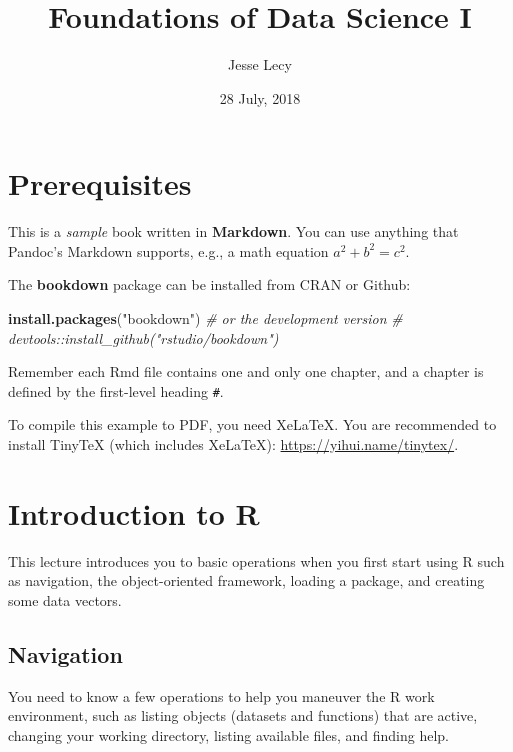 \documentclass[]{book}
\title{Foundations of Data Science I}
\author{Jesse Lecy}
\date{28 July, 2018}
\newenvironment{Shaded}{\begin{snugshade}}{\end{snugshade}}
\newcommand{\CommentTok}[1]{\textcolor[rgb]{0.56,0.35,0.01}{\textit{#1}}}
\newcommand{\KeywordTok}[1]{\textcolor[rgb]{0.13,0.29,0.53}{\textbf{#1}}}
\newcommand{\NormalTok}[1]{#1}
\newcommand{\StringTok}[1]{\textcolor[rgb]{0.31,0.60,0.02}{#1}}
\theoremstyle{definition}
\theoremstyle{definition}
\theoremstyle{definition}
\theoremstyle{remark}
\begin{document}
\maketitle

{
\setcounter{tocdepth}{1}
\tableofcontents
}
\hypertarget{prerequisites}{%
\chapter{Prerequisites}\label{prerequisites}}

This is a \emph{sample} book written in \textbf{Markdown}. You can use
anything that Pandoc's Markdown supports, e.g., a math equation
\(a^2 + b^2 = c^2\).

The \textbf{bookdown} package can be installed from CRAN or Github:

\begin{Shaded}
\begin{Highlighting}[]
\KeywordTok{install.packages}\NormalTok{(}\StringTok{"bookdown"}\NormalTok{)}
\CommentTok{# or the development version}
\CommentTok{# devtools::install_github("rstudio/bookdown")}
\end{Highlighting}
\end{Shaded}

Remember each Rmd file contains one and only one chapter, and a chapter
is defined by the first-level heading \texttt{\#}.

To compile this example to PDF, you need XeLaTeX. You are recommended to
install TinyTeX (which includes XeLaTeX):
\url{https://yihui.name/tinytex/}.

\hypertarget{introduction-to-r}{%
\chapter{Introduction to R}\label{introduction-to-r}}

This lecture introduces you to basic operations when you first start
using R such as navigation, the object-oriented framework, loading a
package, and creating some data vectors.

\hypertarget{navigation}{%
\section{Navigation}\label{navigation}}

You need to know a few operations to help you maneuver the R work
environment, such as listing objects (datasets and functions) that are
active, changing your working directory, listing available files, and
finding help.
\end{document}
